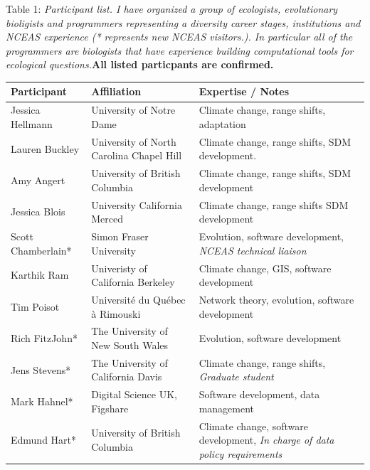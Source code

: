 \documentclass[pdftex,11pt,a4paper]{article}\usepackage{graphicx, color}
\begin{document}
Table 1: \textit{Participant list.  I have organized a group of ecologists, evolutionary bioligists and programmers representing a diversity career stages, institutions and NCEAS experience (* represents new NCEAS visitors.).  In particular all of the programmers are biologists that have experience building computational tools for ecological questions.}\textbf{All listed particpants are confirmed.}
\begin{center}
    \begin{tabularx}{\linewidth}{ | l | l | X |}
    \hline
    \textbf{Participant} & \textbf{Affiliation} & \textbf{Expertise / Notes} \\ \hline
    
    Jessica Hellmann & University of Notre Dame & Climate change, range shifts, adaptation \\ \hline
   
    Lauren Buckley & University of North Carolina Chapel Hill & Climate change, range shifts, SDM development. \\ \hline
    
    Amy Angert & University of British Columbia & Climate change, range shifts, SDM development \\ \hline
     
  Jessica Blois &  University California Merced & Climate change, range shifts SDM development  \\ \hline   
     
  Scott Chamberlain* & Simon Fraser University & Evolution, software development, \textit{NCEAS technical liaison} \\ \hline
  
    Karthik Ram & Univeristy of California Berkeley & Climate change, GIS, software development \\ \hline
 
    Tim Poisot & Université du Québec à Rimouski & Network theory, evolution, software development \\ \hline

  Rich FitzJohn* & The University of New South Wales & Evolution, software development \\ \hline
    
    Jens Stevens* & The University of California Davis & Climate change, range shifts, \textit{Graduate student} \\ \hline 
    
    Mark Hahnel* & Digital Science UK, Figshare & Software development, data management \\ \hline
  
   Edmund Hart* & University of British Columbia & Climate change, software development,        \textit{In charge of data policy requirements} \\ \hline
   
   
   \end{tabularx}
\end{center}
\end{document}
